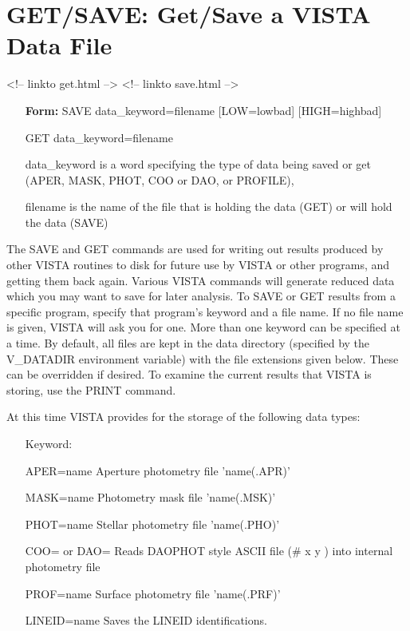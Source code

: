 \section{GET/SAVE: Get/Save a VISTA Data File}
\begin{rawhtml}
<!-- linkto get.html -->
<!-- linkto save.html -->
\end{rawhtml}
\begin{itemize}
  \item[\textbf{Form: } SAVE data\_keyword=filename {[LOW=lowbad]} 
       {[HIGH=highbad]}\hfill]{}
  \item[GET  data\_keyword=filename\hfill]{}
  \item[data\_keyword]{is a word specifying the type of data
       being saved or get (APER, MASK, PHOT, COO or DAO, or PROFILE),}
  \item[filename]{is the name of the file that is holding
       the data (GET) or will hold the data (SAVE)}
\end{itemize}

The SAVE and GET commands are used for writing out results produced by
other VISTA routines to disk for future use by VISTA or other programs, and
getting them back again.  Various VISTA commands will generate reduced data
which you may want to save for later analysis.  To SAVE or GET results from
a specific program, specify that program's keyword and a file name.  If no
file name is given, VISTA will ask you for one.  More than one keyword can
be specified at a time.  By default, all files are kept in the data
directory (specified by the V\_DATADIR environment variable) with the file
extensions given below.  These can be overridden if desired.  To examine
the current results that VISTA is storing, use the PRINT command.

At this time VISTA provides for the storage of the following data types:

\begin{itemize}
  \item[Keyword:\hfill]{}
  \item[APER=name]{Aperture photometry file 'name(.APR)'}
  \item[MASK=name]{Photometry mask file 'name(.MSK)'}
  \item[PHOT=name]{Stellar photometry file 'name(.PHO)'}
  \item[COO= or DAO=]{Reads DAOPHOT style ASCII file (\# x y ) into
       internal photometry file}
  \item[PROF=name]{Surface photometry file 'name(.PRF)'}
  \item[LINEID=name]{Saves the LINEID identifications.}
\end{itemize}

